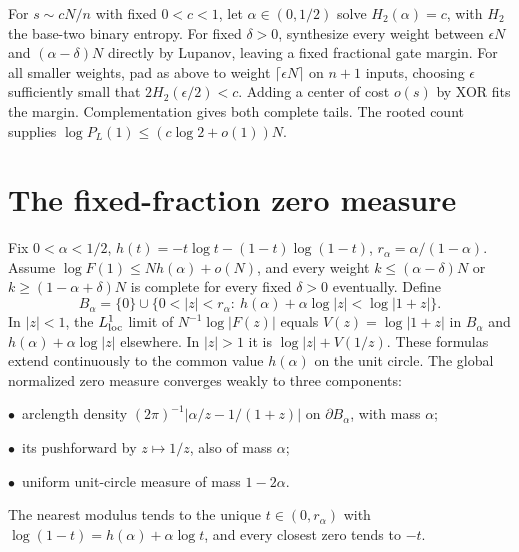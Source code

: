 \documentclass[11pt]{article}
\begin{document}
For $s\sim cN/n$ with fixed $0<c<1$, let $\alpha\in(0,1/2)$ solve $H_2(\alpha)=c$, with $H_2$ the base-two binary entropy. For fixed $\delta>0$, synthesize every weight between $\epsilon N$ and $(\alpha-\delta)N$ directly by Lupanov, leaving a fixed fractional gate margin. For all smaller weights, pad as above to weight $\lceil\epsilon N\rceil$ on $n+1$ inputs, choosing $\epsilon$ sufficiently small that $2H_2(\epsilon/2)<c$. Adding a center of cost $o(s)$ by XOR fits the margin. Complementation gives both complete tails. The rooted count supplies $\log P_L(1)\le(c\log2+o(1))N$.
\section{The fixed-fraction zero measure}
Fix \(0<\alpha<1/2\), \(h(t)=-t\log t-(1-t)\log(1-t)\), \(r_\alpha=\alpha/(1-\alpha)\). Assume \(\log F(1)\le Nh(\alpha)+o(N)\), and every weight \(k\le(\alpha-\delta)N\) or \(k\ge(1-\alpha+\delta)N\) is complete for every fixed \(\delta>0\) eventually. Define
\[
 B_\alpha=\{0\}\cup\{0<|z|<r_\alpha:\ h(\alpha)+\alpha\log|z|<\log|1+z|\}.
\]
In \(|z|<1\), the \(L^1_{\rm loc}\) limit of \(N^{-1}\log|F(z)|\) equals \(V(z)=\log|1+z|\) in \(B_\alpha\) and \(h(\alpha)+\alpha\log|z|\) elsewhere. In \(|z|>1\) it is \(\log|z|+V(1/z)\). These formulas extend continuously to the common value \(h(\alpha)\) on the unit circle. The global normalized zero measure converges weakly to three components:

\par\noindent$\bullet$\ arclength density \((2\pi)^{-1}|\alpha/z-1/(1+z)|\) on \(\partial B_\alpha\), with mass \(\alpha\);
\par\noindent$\bullet$\ its pushforward by \(z\mapsto1/z\), also of mass \(\alpha\);
\par\noindent$\bullet$\ uniform unit-circle measure of mass \(1-2\alpha\).

The nearest modulus tends to the unique \(t\in(0,r_\alpha)\) with \(\log(1-t)=h(\alpha)+\alpha\log t\), and every closest zero tends to \(-t\).
\end{document}
